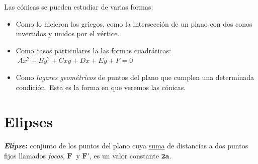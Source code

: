 Las cónicas se pueden estudiar de varias formas:

\begin{itemize}
\item Como lo hicieron los griegos, como la intersección de un plano con dos conos invertidos y unidos por el vértice.
\item Como casos particulares la las formas cuadráticas: $\ Ax^2+By^2+Cxy+Dx+Ey+F=0$
\item Como \emph{lugares geométricos} de puntos del plano que cumplen una determinada condición. Esta es la forma en que veremos las cónicas.
\end{itemize}

\vspace{5mm}
\section{Elipses}
\vspace{-5mm}
\vspace{0.5cm}

\begin{definition}[ Elipse]

\textbf{\emph{Elipse}:} conjunto de los puntos del plano cuya \underline{suma} de distancias a dos puntos fijos llamados \emph{focos}, $\boldsymbol F\ \text{ y } \boldsymbol{F'}$, es un valor constante $\boldsymbol{2a}$.	
\end{definition}


